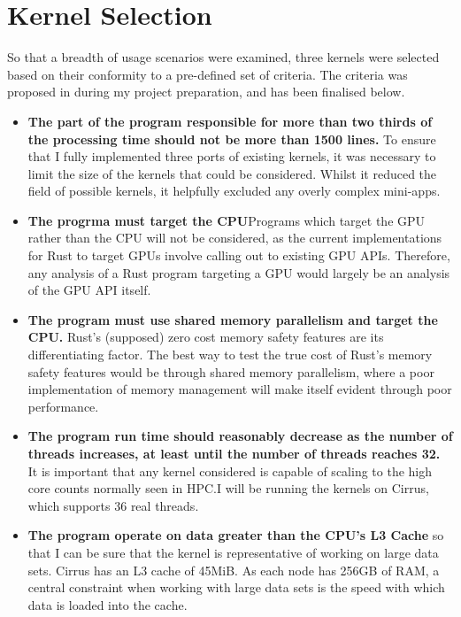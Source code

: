 \section{Kernel Selection}
So that a breadth of usage scenarios were examined, three kernels were selected based on their conformity to a pre-defined set of criteria. The criteria was proposed in during my project preparation, and has been finalised below.
\begin{itemize}
  \item \textbf{The part of the program responsible for more than two thirds of the processing time should not be more than 1500 lines.} To ensure that I fully implemented three ports of existing kernels, it was necessary to limit the size of the kernels that could be considered. Whilst it reduced the field of possible kernels, it helpfully excluded any overly complex mini-apps.

  \item \textbf{The progrma must target the CPU}Programs which target the GPU rather than the CPU will not be considered, as the current implementations for Rust to target GPUs involve calling out to existing GPU APIs. Therefore, any analysis of a Rust program targeting a GPU would largely be an analysis of the GPU API itself.

  \item \textbf{The program must use shared memory parallelism and target the CPU.} Rust's (supposed) zero cost memory safety features are its differentiating factor. The best way to test the true cost of Rust's memory safety features would be through shared memory parallelism, where a poor implementation of memory management will make itself evident through poor performance.
  
  \item \textbf{The program run time should reasonably decrease as the number of threads increases, at least until the number of threads reaches 32.} It is important that any kernel considered is capable of scaling to the high core counts normally seen in HPC.I will be running the kernels on Cirrus, which supports 36 real threads.

  \item \textbf{The program operate on data greater than the CPU's L3 Cache} so that I can be sure that the kernel is representative of working on large data sets. Cirrus has an L3 cache of 45MiB. As each node has 256GB of RAM, a central constraint when working with large data sets is the speed with which data is loaded into the cache. 


\end{itemize}
